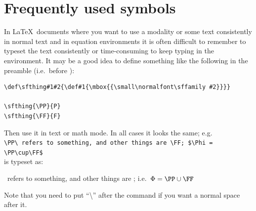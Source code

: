 \section{Frequently used symbols\label{sec:fus}}

In \LaTeX\ documents where you want to use a modality or some text consistently in normal text and in equation environments it is often difficult to remember to typeset the text consistently or time-consuming to keep typing in the environment. It may be a good idea to define something like the following in the preamble (i.e.\ before \verb++):

\begin{verbatim}
\def\sfthing#1#2{\def#1{\mbox{{\small\normalfont\sffamily #2}}}}

\sfthing{\PP}{P}
\sfthing{\FF}{F}
\end{verbatim}

Then use it in text or math mode. In all cases it looks the same; e.g.\\
\verb+\PP\ refers to something, and other things are \FF; $\Phi = \PP\cup\FF$+\\
is typeset as:

\PP\ refers to something, and other things are \FF; i.e.\ $\Phi = \PP\cup\FF$

Note that you need to put ``\textbackslash'' after the command if you want a normal space after it.
